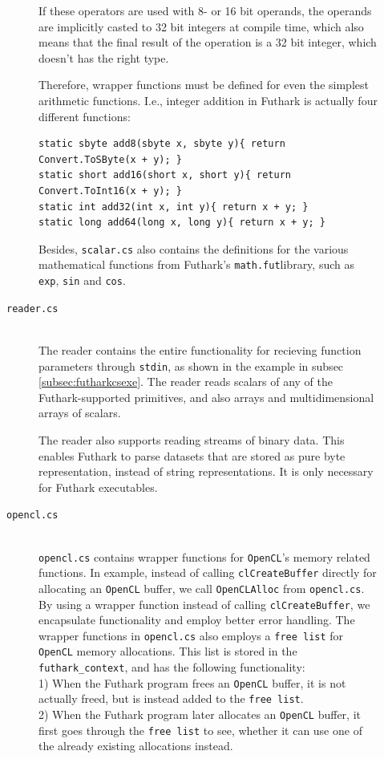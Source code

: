 \begin{description}
\begin{description}
  If these operators are used with 8- or 16 bit operands, the operands are
  implicitly casted to 32 bit integers at compile time, which also means that
  the final result of the operation is a 32 bit integer, which doesn't has the
  right type.

  Therefore, wrapper functions must be defined for even the simplest arithmetic
  functions. I.e., integer addition in \csharp{} Futhark is actually four different
  functions:
\begin{verbatim}
static sbyte add8(sbyte x, sbyte y){ return Convert.ToSByte(x + y); }
static short add16(short x, short y){ return Convert.ToInt16(x + y); }
static int add32(int x, int y){ return x + y; }
static long add64(long x, long y){ return x + y; }
\end{verbatim}

  Besides, \texttt{scalar.cs} also contains the \csharp{} definitions for the various
  mathematical functions from Futhark's \texttt{math.fut}library, such as \texttt{exp},
  \texttt{sin} and \texttt{cos}.


\item[\texttt{reader.cs}] \hfill\\
  The reader contains the entire functionality for recieving function parameters
  through \texttt{stdin}, as shown in the example in subsec
  \ref{subsec:futharkcsexe}.
  The reader reads scalars of any of the Futhark-supported primitives, and also arrays and multidimensional arrays of scalars.

  The reader also supports reading streams of binary data. This enables Futhark
  to parse datasets that are stored as pure byte representation, instead of
  string representations.
  It is only necessary for Futhark executables.
  

\item[\texttt{opencl.cs}] \hfill\\
  \texttt{opencl.cs} contains wrapper functions for \texttt{OpenCL}'s memory
  related functions. In example, instead of calling \texttt{clCreateBuffer} directly for
  allocating an \texttt{OpenCL} buffer, we call \texttt{OpenCLAlloc} from
  \texttt{opencl.cs}. By using a wrapper function instead of calling
  \texttt{clCreateBuffer}, we encapsulate functionality and employ better error
  handling.
  The wrapper functions in \texttt{opencl.cs} also employs a \texttt{free list} for \texttt{OpenCL}
  memory allocations. This list is stored in the \texttt{futhark\_context}, and
  has the following functionality:
  \\
  1) When the Futhark program frees an \texttt{OpenCL} buffer, it is not
  actually freed, but is instead added to the \texttt{free list}.\\
  2) When the Futhark program later allocates an \texttt{OpenCL} buffer, it
  first goes through the \texttt{free list} to see, whether it can use one of the already
  existing allocations instead.
\end{description}


\end{description}
